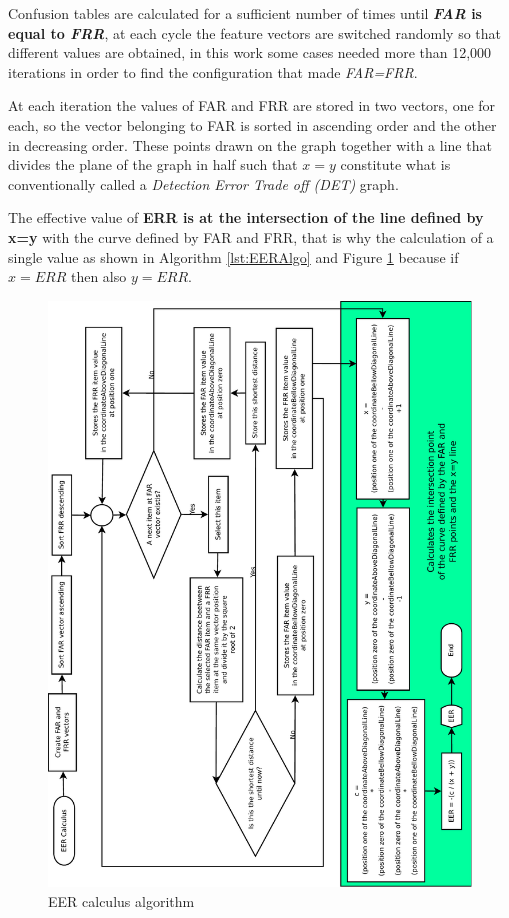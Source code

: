 		\par Confusion tables are calculated for a sufficient number of times until \textbf{\textit{FAR} is equal to \textit{FRR}}, at each cycle the feature vectors are switched randomly so that different values are obtained, in this work some cases needed more than 12,000 iterations in order to find the configuration that made \textit{FAR=FRR}.

		\par At each iteration the values of FAR and FRR are stored in two vectors, one for each, so the vector belonging to FAR is sorted in ascending order and the other in decreasing order. These points drawn on the graph together with a line that divides the plane of the graph in half such that $x=y$ constitute what is conventionally called a \textit{Detection Error Trade off (DET)} graph.\\
		
		\par The effective value of \textbf{ERR is at the intersection of the line defined by x=y} with the curve defined by FAR and FRR, that is why the calculation of a single value as shown in Algorithm \ref{lst:EERAlgo} and Figure \ref{fig:eeralgo} because if $x=ERR$ then also $y=ERR$.\\
		
		
		
		\begin{figure}[H]
			\centering
			\includegraphics[angle=-90, width=1\linewidth]{images/EERAlgo.pdf}
			\caption{EER calculus algorithm}
			\label{fig:eeralgo}
		\end{figure}

